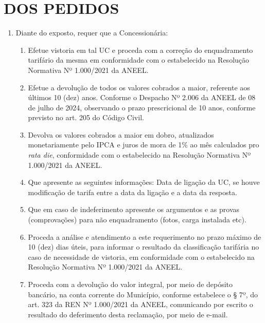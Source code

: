 \section{DOS PEDIDOS}

\begin{enumerate}[resume]
\item 
Diante do exposto, requer que a Concessionária:

\begin{enumerate}
\item 
Efetue vistoria em tal UC e proceda com a correção do enquadramento tarifário da mesma em conformidade com o estabelecido na Resolução Normativa Nº 1.000/2021 da ANEEL.
\item 
Efetue a devolução de todos os valores cobrados a maior, referente aos últimos 10 (dez) anos. Conforme o Despacho Nº 2.006 da ANEEL de 08 de julho de 2024, observando o prazo prescricional de 10 anos, conforme previsto no art. 205 do Código Civil.
\item 
Devolva os valores cobrados a maior em dobro, atualizados monetariamente pelo IPCA e juros de mora de 1\% ao mês calculados pro \textit{rata die}, conformidade com o estabelecido na Resolução Normativa Nº 1.000/2021 da ANEEL.   
\item 
Que apresente as seguintes informações: Data de ligação da UC, se houve modificação de tarifa entre a data da ligação e a data da resposta.   
\item 
Que em caso de indeferimento apresente os argumentos e as provas (comprovações) para não enquadramento (fotos, carga instalada etc).   
\item 
Proceda a análise e atendimento a este requerimento no prazo máximo de 10 (dez) dias úteis, para informar o resultado da classificação tarifária no caso de necessidade de vistoria, em conformidade com o estabelecido na Resolução Normativa Nº 1.000/2021 da ANEEL.  
\item 
Proceda com a devolução do valor integral, por meio de depósito bancário, na conta corrente do Município, conforme estabelece o § 7º, do art. 323 da REN Nº 1.000/2021 da ANEEL, comunicando por escrito o resultado do deferimento desta reclamação, por meio de e-mail.

\end{enumerate}
\end{enumerate}